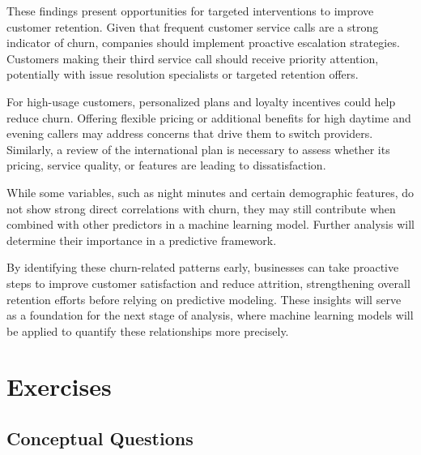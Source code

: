 \documentclass[
  11pt,
]{book}
\theoremstyle{definition}
\theoremstyle{definition}
\theoremstyle{definition}
\theoremstyle{definition}
\theoremstyle{remark}
\begin{document}
These findings present opportunities for targeted interventions to improve customer retention. Given that frequent customer service calls are a strong indicator of churn, companies should implement proactive escalation strategies. Customers making their third service call should receive priority attention, potentially with issue resolution specialists or targeted retention offers.

For high-usage customers, personalized plans and loyalty incentives could help reduce churn. Offering flexible pricing or additional benefits for high daytime and evening callers may address concerns that drive them to switch providers. Similarly, a review of the international plan is necessary to assess whether its pricing, service quality, or features are leading to dissatisfaction.

While some variables, such as night minutes and certain demographic features, do not show strong direct correlations with churn, they may still contribute when combined with other predictors in a machine learning model. Further analysis will determine their importance in a predictive framework.

By identifying these churn-related patterns early, businesses can take proactive steps to improve customer satisfaction and reduce attrition, strengthening overall retention efforts before relying on predictive modeling. These insights will serve as a foundation for the next stage of analysis, where machine learning models will be applied to quantify these relationships more precisely.

\section{Exercises}\label{exercises-2}

\subsection*{Conceptual Questions}\label{conceptual-questions}
\end{document}
